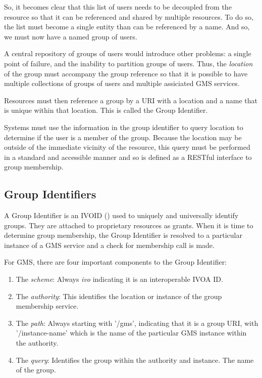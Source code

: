 \documentclass[11pt,a4paper]{ivoa}
\begin{document}
So, it becomes clear that this list of users needs to be decoupled from the resource so that it can be referenced and shared by multiple resources.  To do so, the list must become a single entity than can be referenced by a name.  And so, we must now have a named group of users.

A central repository of groups of users would introduce other problems:  a single point of failure, and the inability to partition groups of users.  Thus, the \emph{location} of the group must accompany the group reference so that it is possible to have multiple collections of groups of users and multiple assiciated GMS services.

Resources must then reference a group by a URI with a location and a name that is unique within that location.  This is called the Group Identifier.

Systems must use the information in the group identifier to query location to determine if the user is a member of the group.  Because the location may be outside of the immediate vicinity of the resource, this query must be performed in a standard and accessible manner and so is defined as a RESTful interface to group membership.

\subsection{Group Identifiers}

A Group Identifier is an IVOID (\citep{std:VOID2}) used to uniquely and universally identify groups.  They are attached to proprietary resources as grants.  When it is time to determine group membership, the Group Identifier is resolved to a particular instance of a GMS service and a check for membership call is made.

For GMS, there are four important components to the Group Identifier:

\begin{enumerate}
\item The \emph{scheme}: Always \emph{ivo} indicating it is an interoperable IVOA ID.
\item The \emph{authority}: This identifies the location or instance of the group membership service.
\item The \emph{path}: Always starting with '/gms', indicating that it is a group URI, with '/instance-name' which is the name of the particular GMS instance within the authority.
\item The \emph{query}: Identifies the group within the authority and instance.  The name of the group.
\end{enumerate}
\end{document}
